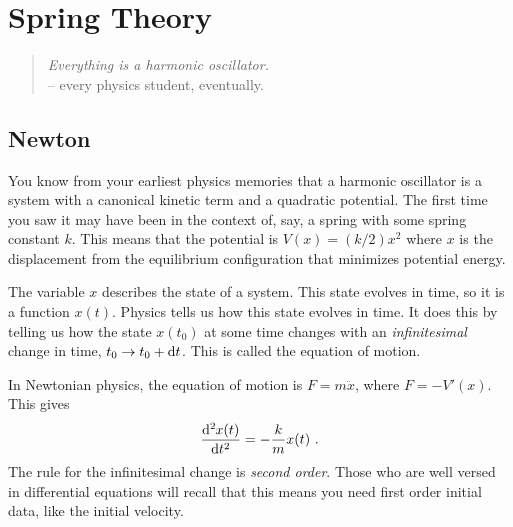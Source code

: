 \chapter{Spring Theory}

\begin{quote}
\emph{Everything is a harmonic oscillator.}
\\ -- every physics student, eventually.
\end{quote}


\section{Newton}

You know from your earliest physics memories that a harmonic oscillator is a system with a canonical kinetic term and a quadratic potential. The first time you saw it may have been in the context of, say, a spring with some spring constant $k$. This means that the potential is $V(x)=(k/2)x^2$ where $x$ is the displacement from the equilibrium configuration that minimizes potential energy. 

The variable $x$ describes the state of a system. This state evolves in time, so it is a function $x(t)$. Physics tells us how this state evolves in time. It does this by telling us how the state $x(t_0)$ at some time changes with an \emph{infinitesimal} change in time, $t_0 \to t_0 + \D{t}$. This is called the equation of motion. 

In Newtonian physics, the equation of motion is $F=m\ddot{x}$, where $F = -V'(x)$. This gives
\begin{align}
    \frac{ \D[2]{x(t)} }{ \D{t}^2 } 
    = 
    - \frac{ k }{ m } x(t) \ .
\end{align}
The rule for the infinitesimal change is \emph{second order}. Those who are well versed in differential equations will recall that this means you need first order initial data, like the initial velocity.


